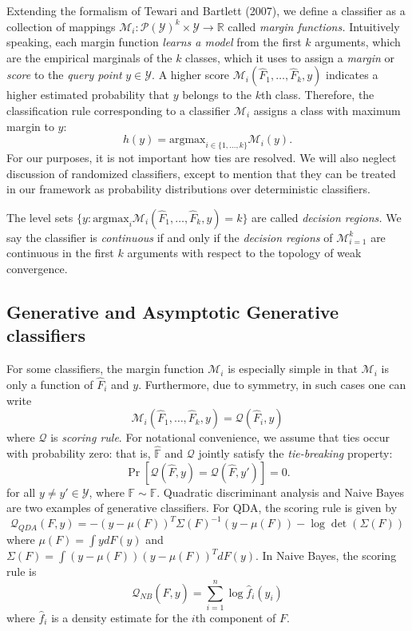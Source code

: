 \documentclass{article}
\newcommand{\argmax}{\text{argmax}}
\begin{document}
Extending the formalism of Tewari and Bartlett (2007), 
we define a classifier as a collection of mappings
$\mathcal{M}_i: \mathcal{P}(\mathcal{Y})^k \times \mathcal{Y} \to \mathbb{R}$ called \emph{margin functions.}
Intuitively speaking, each margin function \emph{learns a model} from the first $k$ arguments, which are
the empirical marginals of the $k$ classes, which it uses to assign a \emph{margin} or \emph{score} to the
\emph{query point} $y \in \mathcal{Y}$.  A higher score $\mathcal{M}_i(\hat{F}_1,\hdots, \hat{F}_k, y)$ indicates a higher estimated probability that $y$ belongs to the $k$th class.  
Therefore, the classification rule corresponding to a classifier $\mathcal{M}_i$ assigns
a class with maximum margin to $y$:
\[
h(y) = \argmax_{i \in \{1,\hdots, k\}} \mathcal{M}_i(y).
\]
For our purposes, it is not important how ties are resolved.  We will also neglect discussion of randomized classifiers,
except to mention that they can be treated in our framework as probability distributions over deterministic classifiers.

The level sets $\{y: \argmax_i \mathcal{M}_i(\hat{F}_1,\hdots, \hat{F}_k, y) = k\}$ are called
\emph{decision regions.}  We say the classifier is \emph{continuous}
if and only if the \emph{decision regions} of $\mathcal{M}_{i=1}^k$ are
continuous in the first $k$ arguments with respect to the topology of
weak convergence.

\subsection{Generative and Asymptotic Generative classifiers}

For some classifiers, the margin function $\mathcal{M}_i$ is especially simple
in that $\mathcal{M}_i$ is only a function of $\hat{F}_i$ and $y$.
Furthermore, due to symmetry, in such cases one can write
\[
\mathcal{M}_i(\hat{F}_1,\hdots, \hat{F}_k, y) = \mathcal{Q}(\hat{F}_i, y)
\]
where $\mathcal{Q}$ is \emph{scoring rule}.
For notational convenience, we assume that ties occur with probability
zero: that is, $\hat{\mathbb{F}}$ and $\mathcal{Q}$ jointly satisfy the
\emph{tie-breaking} property:
\begin{equation}\label{eq:tie}
\Pr[\mathcal{Q}(\hat{F}, y) = \mathcal{Q}(\hat{F}, y')] = 0.
\end{equation}
for all $y \neq y' \in \mathcal{Y}$, where $\mathbb{F} \sim \hat{\mathbb{F}}$.
Quadratic discriminant analysis and Naive Bayes are two examples of
generative classifiers.  For QDA, the scoring rule is given by
\[
\mathcal{Q}_{QDA}(F, y) = -(y - \mu(F))^T \Sigma(F)^{-1} (y-\mu(F)) - \log\det(\Sigma(F))
\]
where $\mu(F) = \int y dF(y)$ and $\Sigma(F) = \int (y-\mu(F))(y-\mu(F))^T dF(y)$.
In Naive Bayes, the scoring rule is
\[
\mathcal{Q}_{NB}(\hat{F},  y) = \sum_{i=1}^n \log \hat{f}_i(y_i)
\]
where $\hat{f}_i$ is a density estimate for the $i$th component of
$F$.
\end{document}
